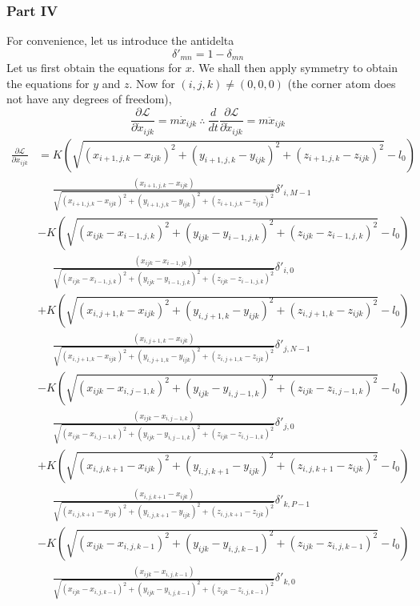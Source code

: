 \documentclass[letterpaper,12pt]{article}
\newcommand*{\deriv}[2]{\frac{d #1}{d #2}}
\newcommand*{\pderiv}[2]{\frac{\partial #1}{\partial #2}}
\begin{document}
\begin{flushleft}
    \subsubsection*{Part IV}
    For convenience, let us introduce the antidelta
    $$\delta'_{mn} = 1 - \delta_{mn}$$
    Let us first obtain the equations for $x$. We shall then apply symmetry to obtain the equations for $y$ and $z$. Now for $(i,j,k) \neq (0,0,0)$ (the corner atom does not have any degrees of freedom),
    $$\pderiv{\mathcal{L}}{\dot{x}_{ijk}} = m\dot{x}_{ijk} \: \therefore \: \deriv{}{t}\pderiv{\mathcal{L}}{\dot{x}_{ijk}} = m\ddot{x}_{ijk}$$
    \begin{align*}
        \pderiv{\mathcal{L}}{x_{ijk}} &= K\left(\sqrt{(x_{i+1,j,k} - x_{ijk})^2 + (y_{i+1,j,k} - y_{ijk})^2 + (z_{i+1,j,k} - z_{ijk})^2} - l_0\right)\\&\mathrel{\phantom{=}}\frac{(x_{i+1,j,k} - x_{ijk})}{\sqrt{(x_{i+1,j,k} - x_{ijk})^2 + (y_{i+1,j,k} - y_{ijk})^2 + (z_{i+1,j,k} - z_{ijk})^2}}\delta'_{i,M-1} \\
        &- K\left(\sqrt{(x_{ijk} - x_{i-1,j,k})^2 + (y_{ijk} - y_{i-1,j,k})^2 + (z_{ijk} - z_{i-1,j,k})^2} - l_0\right)\\&\mathrel{\phantom{=}}\frac{(x_{ijk} - x_{i-1,jk})}{\sqrt{(x_{ijk} - x_{i-1,j,k})^2 + (y_{ijk} - y_{i-1,j,k})^2 + (z_{ijk} - z_{i-1,j,k})^2}}\delta'_{i,0} \\
        &+ K\left(\sqrt{(x_{i,j+1,k} - x_{ijk})^2 + (y_{i,j+1,k} - y_{ijk})^2 + (z_{i,j+1,k} - z_{ijk})^2} - l_0\right)\\&\mathrel{\phantom{=}}\frac{(x_{i,j+1,k} - x_{ijk})}{\sqrt{(x_{i,j+1,k} - x_{ijk})^2 + (y_{i,j+1,k} - y_{ijk})^2 + (z_{i,j+1,k} - z_{ijk})^2}}\delta'_{j,N-1} \\
        &- K\left(\sqrt{(x_{ijk} - x_{i,j-1,k})^2 + (y_{ijk} - y_{i,j-1,k})^2 + (z_{ijk} - z_{i,j-1,k})^2} - l_0\right)\\&\mathrel{\phantom{=}}\frac{(x_{ijk} - x_{i,j-1,k})}{\sqrt{(x_{ijk} - x_{i,j-1,k})^2 + (y_{ijk} - y_{i,j-1,k})^2 + (z_{ijk} - z_{i,j-1,k})^2}}\delta'_{j,0} \\
        &+ K\left(\sqrt{(x_{i,j,k+1} - x_{ijk})^2 + (y_{i,j,k+1} - y_{ijk})^2 + (z_{i,j,k+1} - z_{ijk})^2} - l_0\right)\\&\mathrel{\phantom{=}}\frac{(x_{i,j,k+1} - x_{ijk})}{\sqrt{(x_{i,j,k+1} - x_{ijk})^2 + (y_{i,j,k+1} - y_{ijk})^2 + (z_{i,j,k+1} - z_{ijk})^2}}\delta'_{k,P-1} \\
        &- K\left(\sqrt{(x_{ijk} - x_{i,j,k-1})^2 + (y_{ijk} - y_{i,j,k-1})^2 + (z_{ijk} - z_{i,j,k-1})^2} - l_0\right)\\&\mathrel{\phantom{=}}\frac{(x_{ijk} - x_{i,j,k-1})}{\sqrt{(x_{ijk} - x_{i,j,k-1})^2 + (y_{ijk} - y_{i,j,k-1})^2 + (z_{ijk} - z_{i,j,k-1})^2}}\delta'_{k,0}

\end{align*}
\end{flushleft}
\end{document}
